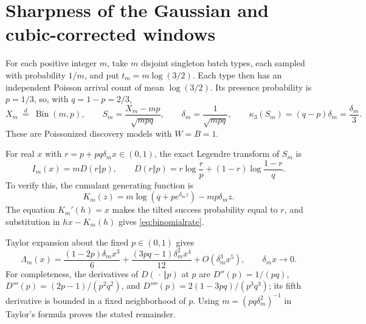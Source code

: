 \documentclass[11pt]{article}
\numberwithin{equation}{section}
\theoremstyle{remark}
\newcommand{\Bin}{\operatorname{Bin}}
\begin{document}
\section{Sharpness of the Gaussian and cubic-corrected windows}
\label{sec:sharpness}

For each positive integer $m$, take $m$ disjoint singleton batch types,
each sampled with probability $1/m$, and put $t_m=m\log(3/2)$. Each
type then has an independent Poisson arrival count of mean $\log(3/2)$.
Its presence probability is $p=1/3$, so, with $q=1-p=2/3$,
\begin{equation}\label{eq:binomialmodel}
 X_m\ \stackrel{d}{=}\ \Bin(m,p),\qquad
 S_m=\frac{X_m-mp}{\sqrt{mpq}},\qquad
 \delta_m=\frac1{\sqrt{mpq}},\qquad
 \kappa_3(S_m)=(q-p)\delta_m=\frac{\delta_m}{3}.
\end{equation}
These are Poissonized discovery models with $W=B=1$.

For real $x$ with $r=p+pq\delta_m x\in(0,1)$, the exact Legendre transform
of $S_m$ is
\begin{equation}\label{eq:binomialrate}
 I_m(x)=mD(r\Vert p),\qquad
 D(r\Vert p)=r\log\frac rp+(1-r)\log\frac{1-r}{q}.
\end{equation}
To verify this, the cumulant generating function is
\[
 K_m(z)=m\log(q+pe^{\delta_m z})-mp\delta_m z.
\]
The equation $K_m'(h)=x$ makes the tilted success probability equal to $r$,
and substitution in $hx-K_m(h)$ gives \eqref{eq:binomialrate}.

Taylor expansion about the fixed $p\in(0,1)$ gives
\begin{equation}\label{eq:binomialLambda}
 \Lambda_m(x)
 =\frac{(1-2p)\delta_m x^3}{6}
  +\frac{(3pq-1)\delta_m^2x^4}{12}
  +O(\delta_m^3x^5),\qquad \delta_m x\to0.
\end{equation}
For completeness, the derivatives of $D(\,\cdot\,\Vert p)$ at $p$ are
$D''(p)=1/(pq)$, $D'''(p)=(2p-1)/(p^2q^2)$, and
$D''''(p)=2(1-3pq)/(p^3q^3)$; its fifth derivative is bounded in a fixed
neighborhood of $p$. Using $m=(pq\delta_m^2)^{-1}$ in Taylor's formula
proves the stated remainder.
\end{document}
